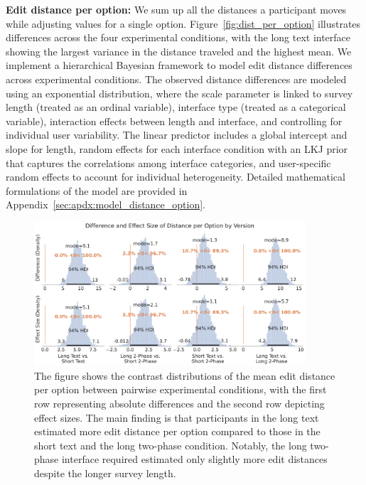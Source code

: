 \textbf{Edit distance per option:} We sum up all the distances a participant moves while adjusting values for a single option. Figure~\ref{fig:dist_per_option} illustrates differences across the four experimental conditions, with the long text interface showing the largest variance in the distance traveled and the highest mean. We implement a hierarchical Bayesian framework to model edit distance differences across experimental conditions. The observed distance differences are modeled using an exponential distribution, where the scale parameter is linked to survey length (treated as an ordinal variable), interface type (treated as a categorical variable), interaction effects between length and interface, and controlling for individual user variability. The linear predictor includes a global intercept and slope for length, random effects for each interface condition with an LKJ prior that captures the correlations among interface categories, and user-specific random effects to account for individual heterogeneity. Detailed mathematical formulations of the model are provided in Appendix~\ref{sec:apdx:model_distance_option}. 

\begin{figure}[ht]
    \centering
    \includegraphics[width=0.9\textwidth]{content/image/distance/distance_diff_per_option_effect_size_by_version.pdf}
    \caption{The figure shows the contrast distributions of the mean edit distance per option between pairwise experimental conditions, with the first row representing absolute differences and the second row depicting effect sizes. The main finding is that participants in the long text estimated more edit distance per option compared to those in the short text and the long two-phase condition. Notably, the long two-phase interface required estimated only slightly more edit distances despite the longer survey length.}
    \label{fig:dist_per_option_bayesian}
\end{figure}


